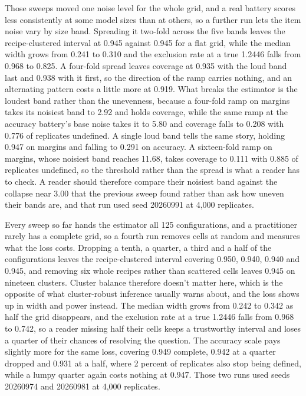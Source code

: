Those sweeps moved one noise level for the whole grid, and a real battery scores less consistently at some model sizes than at others, so a further run lets the item noise vary by size band. Spreading it two-fold across the five bands leaves the recipe-clustered interval at 0.945 against 0.945 for a flat grid, while the median width grows from 0.241 to 0.310 and the exclusion rate at a true 1.2446 falls from 0.968 to 0.825. A four-fold spread leaves coverage at 0.935 with the loud band last and 0.938 with it first, so the direction of the ramp carries nothing, and an alternating pattern costs a little more at 0.919. What breaks the estimator is the loudest band rather than the unevenness, because a four-fold ramp on margins takes its noisiest band to 2.92 and holds coverage, while the same ramp at the accuracy battery's base noise takes it to 5.80 and coverage falls to 0.208 with 0.776 of replicates undefined. A single loud band tells the same story, holding 0.947 on margins and falling to 0.291 on accuracy. A sixteen-fold ramp on margins, whose noisiest band reaches 11.68, takes coverage to 0.111 with 0.885 of replicates undefined, so the threshold rather than the spread is what a reader has to check. A reader should therefore compare their noisiest band against the collapse near 3.00 that the previous sweep found rather than ask how uneven their bands are, and that run used seed 20260991 at 4,000 replicates.

Every sweep so far hands the estimator all 125 configurations, and a practitioner rarely has a complete grid, so a fourth run removes cells at random and measures what the loss costs. Dropping a tenth, a quarter, a third and a half of the configurations leaves the recipe-clustered interval covering 0.950, 0.940, 0.940 and 0.945, and removing six whole recipes rather than scattered cells leaves 0.945 on nineteen clusters. Cluster balance therefore doesn't matter here, which is the opposite of what cluster-robust inference usually warns about, and the loss shows up in width and power instead. The median width grows from 0.242 to 0.342 as half the grid disappears, and the exclusion rate at a true 1.2446 falls from 0.968 to 0.742, so a reader missing half their cells keeps a trustworthy interval and loses a quarter of their chances of resolving the question. The accuracy scale pays slightly more for the same loss, covering 0.949 complete, 0.942 at a quarter dropped and 0.931 at a half, where 2 percent of replicates also stop being defined, while a lumpy quarter again costs nothing at 0.947. Those two runs used seeds 20260974 and 20260981 at 4,000 replicates.

